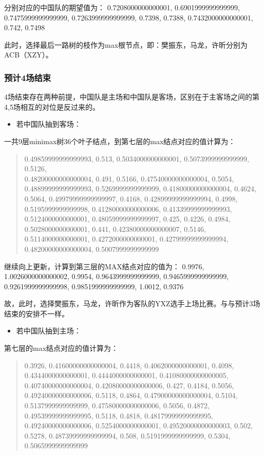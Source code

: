 \documentclass[a4paper,AutoFakeBold,AutoFakeSlant]{ctexart}
\begin{document}
分别对应的中国队的期望值为： 0.7208000000000001, 0.6901999999999999, \\0.7475999999999999, 0.7263999999999999, 0.7398, 0.7388, 0.7432000000000001, 0.742, 0.7498

此时，选择最后一路树的枝作为max根节点，即：樊振东，马龙，许昕分别为ACB（XZY）。

\subsubsection{预计4场结束}
4场结束存在两种前提，中国队是主场和中国队是客场，区别在于主客场之间的第4,5场相互的对位是反过来的。

\begin{itemize}
  \item 若中国队抽到客场：
\end{itemize}

一共9层minimax树36个叶子结点，到第七层的max结点对应的值计算为：
\begin{quote}
  0.49859999999999993,
  0.513,
  0.5034000000000001,
  0.5073999999999999,
  0.5126,\\
  0.48200000000000004,
  0.491,
  0.5166,
  0.47540000000000004,
  0.5054,
  0.48899999999999993,
  0.5269999999999999,
  0.41800000000000004,
  0.4624,
  0.5064,
  0.49979999999999997,
  0.4168,
  0.42899999999999994,
  0.4998,
  0.5195999999999998,
  0.41280000000000006,
  0.41339999999999993,
  0.5124000000000001,
  0.48059999999999997,
  0.425,
  0.4226,
  0.4984,
  0.5028000000000001,
  0.441,
  0.42380000000000007,
  0.5146,
  0.5114000000000001,
  0.4272000000000001,
  0.42799999999999994,
  0.48200000000000004,
  0.5007999999999999
\end{quote}

继续向上更新，计算到第三层的MAX结点对应的值为：
 0.9976,
 1.0026000000000002,
 0.9954,
 0.9643999999999999,
 0.9465999999999999,
 0.9261999999999998,
 0.9851999999999999,
 1.0012,
 0.9376

故，此时，选择樊振东，马龙，许昕作为客队的YXZ选手上场比赛。与与预计3场结束的安排不一样。

\begin{itemize}
  \item 若中国队抽到主场：
\end{itemize}

第七层的max结点对应的值计算为：
\begin{quote}
  0.3926,
  0.41600000000000004,
  0.4418,
  0.4062000000000001,
  0.4098,
  0.4344000000000001,
  0.4444000000000001,
  0.41080000000000005,
  0.40740000000000004,
  0.42080000000000006,
  0.427,
  0.4184,
  0.5056,
  0.49240000000000006,
  0.5118,
  0.4864,
  0.47900000000000004,
  0.5104,
  0.5137999999999999,
  0.47580000000000006,
  0.5056,
  0.4872,
  0.49539999999999995,
  0.5118,
  0.4818,
  0.48179999999999995,
  0.49240000000000006,
  0.5254000000000001,
  0.49520000000000003,
  0.502,
  0.5278,
  0.48739999999999994,
  0.508,
  0.5191999999999999,
  0.5304,
  0.5065999999999999
\end{quote}
\end{document}
